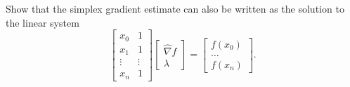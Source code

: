 \documentclass[12pt, leqno]{article}
\begin{document}

Show that the simplex gradient estimate can also be written as the
solution to the linear system
\[
  \begin{bmatrix}
    x_0 & 1 \\
    x_1 & 1 \\
    \vdots & \vdots \\
    x_n & 1
  \end{bmatrix}
  \begin{bmatrix} \hat{\nabla} f \\ \lambda \end{bmatrix} =
  \begin{bmatrix} f(x_0) \\ \ldots \\ f(x_n) \end{bmatrix}.
\]
\end{document}
